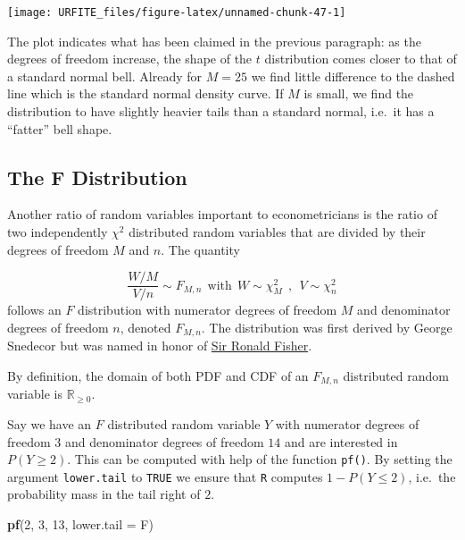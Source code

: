 \documentclass[]{book}
\newenvironment{Shaded}{\begin{snugshade}}{\end{snugshade}}
\newcommand{\KeywordTok}[1]{\textcolor[rgb]{0.13,0.29,0.53}{\textbf{#1}}}
\newcommand{\DataTypeTok}[1]{\textcolor[rgb]{0.13,0.29,0.53}{#1}}
\newcommand{\DecValTok}[1]{\textcolor[rgb]{0.00,0.00,0.81}{#1}}
\newcommand{\NormalTok}[1]{#1}
\theoremstyle{definition}
\theoremstyle{definition}
\theoremstyle{definition}
\theoremstyle{remark}
\begin{document}
\begin{center}\texttt{[image: URFITE\_files/figure-latex/unnamed-chunk-47-1]} \end{center}

The plot indicates what has been claimed in the previous paragraph: as
the degrees of freedom increase, the shape of the \(t\) distribution
comes closer to that of a standard normal bell. Already for \(M=25\) we
find little difference to the dashed line which is the standard normal
density curve. If \(M\) is small, we find the distribution to have
slightly heavier tails than a standard normal, i.e.~it has a ``fatter''
bell shape.

\subsection*{The F Distribution}\label{the-f-distribution}

Another ratio of random variables important to econometricians is the
ratio of two independently \(\chi^2\) distributed random variables that
are divided by their degrees of freedom \(M\) and \(n\). The quantity

\[ \frac{W/M}{V/n} \sim F_{M,n} \ \ \text{with} \ \ W \sim \chi^2_M \ \ , \ \ V \sim \chi^2_n \]
follows an \(F\) distribution with numerator degrees of freedom \(M\)
and denominator degrees of freedom \(n\), denoted \(F_{M,n}\). The
distribution was first derived by George Snedecor but was named in honor
of \href{https://en.wikipedia.org/wiki/Ronald_Fisher}{Sir Ronald
Fisher}.

By definition, the domain of both PDF and CDF of an \(F_{M,n}\)
distributed random variable is \(\mathbb{R}_{\geq0}\).

Say we have an \(F\) distributed random variable \(Y\) with numerator
degrees of freedom \(3\) and denominator degrees of freedom \(14\) and
are interested in \(P(Y \geq 2)\). This can be computed with help of the
function \texttt{pf()}. By setting the argument \texttt{lower.tail} to
\texttt{TRUE} we ensure that \texttt{R} computes \(1- P(Y \leq 2)\),
i.e.~the probability mass in the tail right of \(2\).

\begin{Shaded}
\begin{Highlighting}[]
\KeywordTok{pf}\NormalTok{(}\DecValTok{2}\NormalTok{, }\DecValTok{3}\NormalTok{, }\DecValTok{13}\NormalTok{, }\DataTypeTok{lower.tail =}\NormalTok{ F)}
\end{Highlighting}
\end{Shaded}
\end{document}
